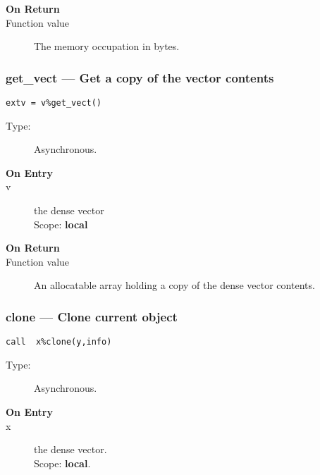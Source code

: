 \begin{description}
\item[\bf On Return]
\item[Function value] The memory occupation in bytes.
\end{description}


\subsubsection*{get\_vect  --- Get a copy of the vector contents}

\begin{verbatim}
extv = v%get_vect()
\end{verbatim}

\begin{description}
\item[Type:] Asynchronous.
\item[\bf On Entry]
\item[v] the dense vector\\
Scope: {\bf local}\\
\end{description}

\begin{description}
\item[\bf On Return]
\item[Function value] An allocatable array holding a copy of the dense
  vector contents.
\end{description}

\subsubsection*{clone --- Clone current object}
\begin{verbatim}
call  x%clone(y,info)
\end{verbatim}

\begin{description}
\item[Type:] Asynchronous.
\item[\bf On Entry]
\item[x] the dense vector.\\
Scope: {\bf local}.\\
\end{description}

